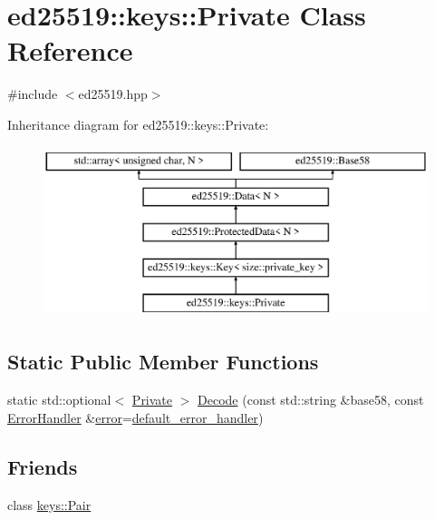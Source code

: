 \hypertarget{classed25519_1_1keys_1_1_private}{}\section{ed25519\+::keys\+::Private Class Reference}
\label{classed25519_1_1keys_1_1_private}


{\ttfamily \#include $<$ed25519.\+hpp$>$}

Inheritance diagram for ed25519\+::keys\+::Private\+:\begin{figure}[H]
\begin{center}
\leavevmode
\includegraphics[height=5.000000cm]{classed25519_1_1keys_1_1_private}
\end{center}
\end{figure}
\subsection*{Static Public Member Functions}
\begin{DoxyCompactItemize}
\item 
static std\+::optional$<$ \mbox{\hyperlink{classed25519_1_1keys_1_1_private}{Private}} $>$ \mbox{\hyperlink{classed25519_1_1keys_1_1_private_adedbd5f3d88c767f5fcf46611585d642}{Decode}} (const std\+::string \&base58, const \mbox{\hyperlink{namespaceed25519_a6ba572942b3c18591fc869d52a6b16e6}{Error\+Handler}} \&\mbox{\hyperlink{namespaceed25519_ac93d0b5156eaca22197055e902920bc4}{error}}=\mbox{\hyperlink{namespaceed25519_a7c7bb6ed17541162959c33ed3e3b15fb}{default\+\_\+error\+\_\+handler}})
\end{DoxyCompactItemize}
\subsection*{Friends}
\begin{DoxyCompactItemize}
\item 
class \mbox{\hyperlink{classed25519_1_1keys_1_1_private_ad89670fe663c8c8526b69b1bc6a87c19}{keys\+::\+Pair}}
\end{DoxyCompactItemize}
